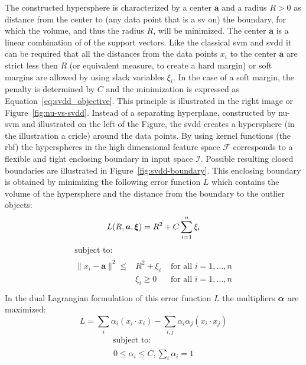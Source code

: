 The constructed hypersphere is characterized by a center $\mathbf{a}$ and a radius $R > 0$ as distance from the center to (any data point that is a \gls{sv} on) the boundary, for which the volume, and thus the radius $R$, will be minimized.
The center $\mathbf{a}$ is a linear combination of of the support vectors.
Like the classical \gls{svm} and \gls{svdd} it can be required that all the distances from the data points $x_i$ to the center $\mathbf{a}$ are strict less then $R$ (or equivalent measure, to create a hard margin) or soft margins are allowed by using slack variables $\xi_i$.
In the case of a soft margin, the penalty is determined by $C$ and the minimization is expressed as Equation~\ref{eq:svdd_objective}.
This principle is illustrated in the right image or Figure~\ref{fig:nu-vs-svdd}.
Instead of a separating hyperplane, constructed by \gls{nu-svm} and illustrated on the left of the Figure, the \gls{svdd} creates a hypersphere (in the illustration a cricle) around the data points.
By using kernel functions (\eg the \gls{rbf}) the hyperspheres in the high dimensional feature space $\mathcal{F}$ corresponds to a flexible and tight enclosing boundary in input space $\mathcal{I}$.
Possible resulting closed boundaries are illustrated in Figure~\ref{fig:svdd-boundary}.
This enclosing boundary is obtained by minimizing the following error function $L$ which contains the volume of the hypersphere and the distance from the boundary to the outlier objects:
\begin{equation}\label{eq:svdd_objective}
  L(R, \vectorsym{a}, \vectorsym{\xi}) = R^2 + C \sum_{i=1}^n \xi_i
\end{equation}
\begin{equation}
  \begin{multlined}
    \mbox{ subject to: } \\
    \begin{aligned}
      \lVert x_i - \mathbf{a} \rVert ^ 2 \leq & R^2 + \xi_i & \mbox{ for all } i = 1, \dots, n \\
      & \xi_i \geq 0 & \mbox{ for all } i = 1, \dots, n \\
    \end{aligned}
  \end{multlined}
\end{equation}
In the dual Lagrangian formulation of this error function $L$ the multipliers $\vectorsym{\alpha}$ are maximized:
\begin{equation}\label{eq:svdd_lagrange}
  L = \sum_{i} \alpha_i(x_i \cdot x_i) - \sum_{i,j} \alpha_i \alpha_j(x_i \cdot x_j)
\end{equation}
\begin{equation}
  \begin{multlined}
    \mbox{ subject to: } \\
    \begin{aligned}
    0 \le \alpha_i \le C, \sum_{i} \alpha_i = 1
    \end{aligned}
  \end{multlined}
\end{equation}

